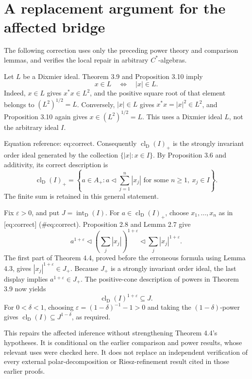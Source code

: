 \documentclass[10pt]{article}
\begin{document}
\section*{A replacement argument for the affected bridge}
The following correction uses only the preceding power theory and comparison lemmas, and verifies the local repair in arbitrary \(C^*\)-algebras.\par
Let \(L\) be a Dixmier ideal. Theorem 3.9 and Proposition 3.10 imply \[x\in L\quad\Longleftrightarrow\quad |x|\in L.\] Indeed, \(x\in L\) gives \(x^*x\in L^2\), and the positive square root of that element belongs to \((L^2)^{1/2}=L\). Conversely, \(|x|\in L\) gives \(x^*x=|x|^2\in L^2\), and Proposition 3.10 again gives \(x\in(L^2)^{1/2}=L\). This uses a Dixmier ideal \(L\), not the arbitrary ideal \(I\).\par
Equation reference: eq:correct. Consequently \(\operatorname{cl}_{\mathrm D}(I)_+\) is the strongly invariant order ideal generated by the collection \(\{|x|:x\in I\}\). By Proposition 3.6 and additivity, its correct description is \[
 \operatorname{cl}_{\mathrm D}(I)_+
 =
 \left\{a\in A_+:
 a\lhd\sum_{j=1}^n|x_j|\text{ for some }n\geq1,\ x_j\in I
 \right\}.\] The finite sum is retained in this general statement.\par
Fix \(\varepsilon>0\), and put \(J=\operatorname{int}_{\mathrm D}(I)\). For \(a\in\operatorname{cl}_{\mathrm D}(I)_+\), choose \(x_1,\ldots,x_n\) as in [eq:correct] (\#eq:correct). Proposition 2.8 and Lemma 2.7 give \[a^{1+\varepsilon}
 \lhd\left(\sum_j|x_j|\right)^{1+\varepsilon}
 \lhd\sum_j|x_j|^{1+\varepsilon}.\] The first part of Theorem 4.4, proved before the erroneous formula using Lemma 4.3, gives \(|x_j|^{1+\varepsilon}\in J_+\). Because \(J_+\) is a strongly invariant order ideal, the last display implies \(a^{1+\varepsilon}\in J_+\). The positive-cone description of powers in Theorem 3.9 now yields \[\operatorname{cl}_{\mathrm D}(I)^{1+\varepsilon}\subseteq J.\] For \(0<\delta<1\), choosing \(\varepsilon=(1-\delta)^{-1}-1>0\) and taking the \((1-\delta)\)-power gives \(\operatorname{cl}_{\mathrm D}(I)\subseteq J^{1-\delta}\), as required.\par
This repairs the affected inference without strengthening Theorem 4.4’s hypotheses. It is conditional on the earlier comparison and power results, whose relevant uses were checked here. It does not replace an independent verification of every external polar-decomposition or Riesz-refinement result cited in those earlier proofs.\par
\end{document}
